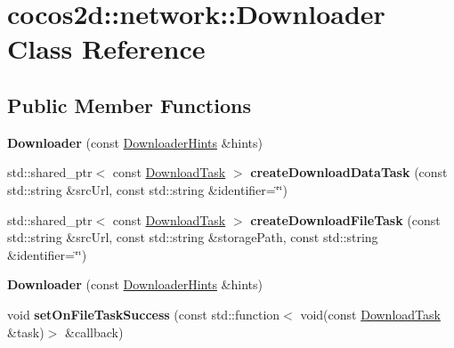 \hypertarget{classcocos2d_1_1network_1_1Downloader}{}\section{cocos2d\+:\+:network\+:\+:Downloader Class Reference}
\label{classcocos2d_1_1network_1_1Downloader}
\subsection*{Public Member Functions}
\begin{DoxyCompactItemize}
\item 
\mbox{\label{classcocos2d_1_1network_1_1Downloader_abf3847bf098f10a49bd1c76eb686d2e3}} 
{\bfseries Downloader} (const \hyperlink{classcocos2d_1_1network_1_1DownloaderHints}{Downloader\+Hints} \&hints)
\item 
\mbox{\label{classcocos2d_1_1network_1_1Downloader_ae021d24f3e35aad8566176a361502b32}} 
std\+::shared\+\_\+ptr$<$ const \hyperlink{classcocos2d_1_1network_1_1DownloadTask}{Download\+Task} $>$ {\bfseries create\+Download\+Data\+Task} (const std\+::string \&src\+Url, const std\+::string \&identifier=\char`\"{}\char`\"{})
\item 
\mbox{\label{classcocos2d_1_1network_1_1Downloader_a3efa7714a27d0a2e5c4d02883b5dba2d}} 
std\+::shared\+\_\+ptr$<$ const \hyperlink{classcocos2d_1_1network_1_1DownloadTask}{Download\+Task} $>$ {\bfseries create\+Download\+File\+Task} (const std\+::string \&src\+Url, const std\+::string \&storage\+Path, const std\+::string \&identifier=\char`\"{}\char`\"{})
\item 
\mbox{\label{classcocos2d_1_1network_1_1Downloader_abf3847bf098f10a49bd1c76eb686d2e3}} 
{\bfseries Downloader} (const \hyperlink{classcocos2d_1_1network_1_1DownloaderHints}{Downloader\+Hints} \&hints)
\item 
\mbox{\label{classcocos2d_1_1network_1_1Downloader_af56a668014aa9998bd02ea3058d8434a}} 
void {\bfseries set\+On\+File\+Task\+Success} (const std\+::function$<$ void(const \hyperlink{classcocos2d_1_1network_1_1DownloadTask}{Download\+Task} \&task)$>$ \&callback)

\end{DoxyCompactItemize}
